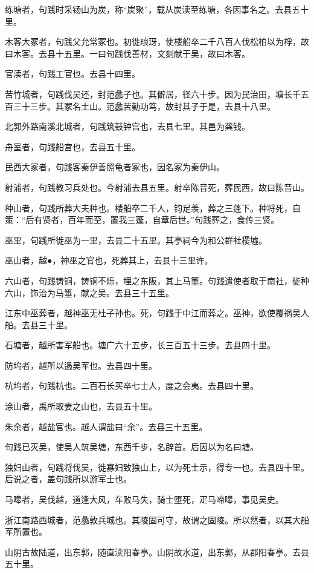 \documentclass[12pt,UTF8]{ctexbook}
\begin{document}
练塘者，句践时采钖山为炭，称“炭聚”，载从炭渎至练塘，各因事名之。去县五十里。

木客大冢者，句践父允常冢也。初徙琅玡，使楼船卒二千八百人伐松柏以为桴，故曰木客。去县十五里。一曰句践伐善材，文刻献于吴，故曰木客。

官渎者，句践工官也。去县十四里。

苦竹城者，句践伐吴还，封范蠡子也。其僻居，径六十步。因为民治田，塘长千五百三十三步。其冢名土山。范蠡苦勤功笃，故封其子于是，去县十八里。

北郭外路南溪北城者，句践筑鼓钟宫也，去县七里。其邑为龚钱。

舟室者，句践船宫也，去县五十里。

民西大冢者，句践客秦伊善照龟者冢也，因名冢为秦伊山。

射浦者，句践教习兵处也。今射浦去县五里。射卒陈音死，葬民西，故曰陈音山。

种山者，句践所葬大夫种也。楼船卒二千人，钧足羡，葬之三蓬下。种将死，自策：“后有贤者，百年而至，置我三蓬，自章后世。”句践葬之，食传三贤。

巫里，句践所徙巫为一里，去县二十五里。其亭祠今为和公群社稷墟。

巫山者，越●，神巫之官也，死葬其上，去县十三里许。

六山者，句践铸铜，铸铜不烁，埋之东阪，其上马箠。句践遣使者取于南社，徙种六山，饰治为马箠，献之吴。去县三十五里。

江东中巫葬者，越神巫无杜子孙也。死，句践于中江而葬之。巫神，欲使覆祸吴人船。去县三十里。

石塘者，越所害军船也。塘广六十五步，长三百五十三步。去县四十里。

防坞者，越所以遏吴军也。去县四十里。

杭坞者，句践杭也。二百石长买卒七士人，度之会夷。去县四十里。

涂山者，禹所取妻之山也，去县五十里。

朱余者，越盐官也。越人谓盐曰“余”。去县三十五里。

句践已灭吴，使吴人筑吴塘，东西千步，名辟首。后因以为名曰塘。

独妇山者，句践将伐吴，徙寡妇致独山上，以为死士示，得专一也。去县四十里。后说之者，盖句践所以游军士也。

马嗥者，吴伐越，道逢大风，车败马失，骑士堕死，疋马啼嗥，事见吴史。

浙江南路西城者，范蠡敦兵城也。其陵固可守，故谓之固陵。所以然者，以其大船军所置也。

山阴古故陆道，出东郭，随直渎阳春亭。山阴故水道，出东郭，从郡阳春亭。去县五十里。
\end{document}
